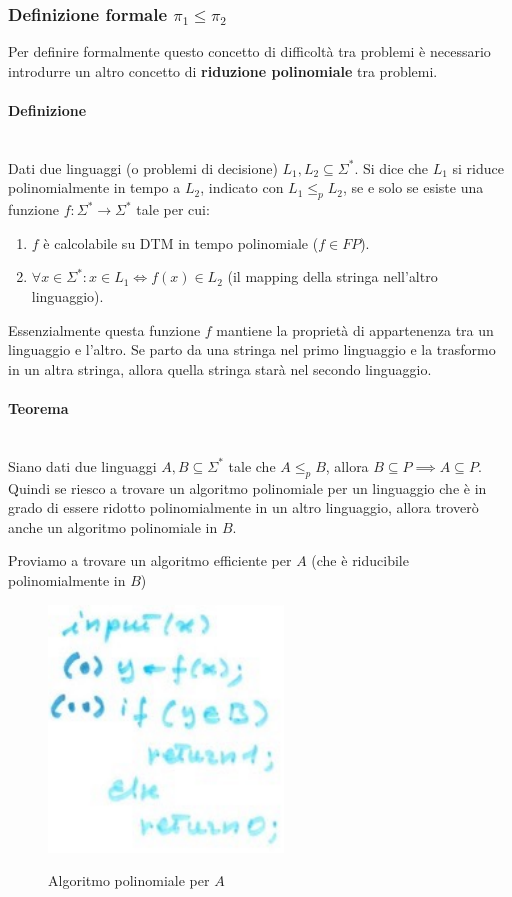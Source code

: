 \documentclass{article}
\begin{document}
\subsubsection{Definizione formale $\pi_1\leq\pi_2$}
Per definire formalmente questo concetto di difficoltà tra problemi è necessario introdurre
un altro concetto di \textbf{riduzione polinomiale} tra problemi.
\paragraph{Definizione}\mbox{}\\
Dati due linguaggi (o problemi di decisione) $L_1,L_2\subseteq\Sigma^*$. Si dice che
$L_1$ si riduce polinomialmente in tempo a $L_2$, indicato con $L_1\leq_{p} L_2$,
se e solo se esiste una funzione $f:\Sigma^*\rightarrow\Sigma^*$ tale per cui:
\begin{enumerate}
    \item $f$ è calcolabile su DTM in tempo polinomiale ($f\in FP$).
    \item $\forall x\in\Sigma^*:x\in L_1\Leftrightarrow f(x)\in L_2$ (il mapping della
          stringa nell'altro linguaggio).
\end{enumerate}
Essenzialmente questa funzione $f$ mantiene la proprietà di appartenenza tra un linguaggio
e l'altro. Se parto da una stringa nel primo linguaggio e la trasformo in un altra stringa,
allora quella stringa starà nel secondo linguaggio.

\paragraph{Teorema}\mbox{}\\
Siano dati due linguaggi $A,B\subseteq\Sigma^*$ tale che $A\leq_p B$, allora
$B\subseteq P\implies A\subseteq P$. Quindi se riesco a trovare un algoritmo polinomiale
per un linguaggio che è in grado di essere ridotto polinomialmente in un altro linguaggio,
allora troverò anche un algoritmo polinomiale in $B$.

Proviamo a trovare un algoritmo efficiente per $A$ (che è riducibile polinomialmente in $B$)
\begin{figure}[H]
    \centering
    \includegraphics[scale=0.6]{images/algo_det_daf.png}
    \label{alg:1}
    \caption{Algoritmo polinomiale per $A$}
\end{figure}
\end{document}
